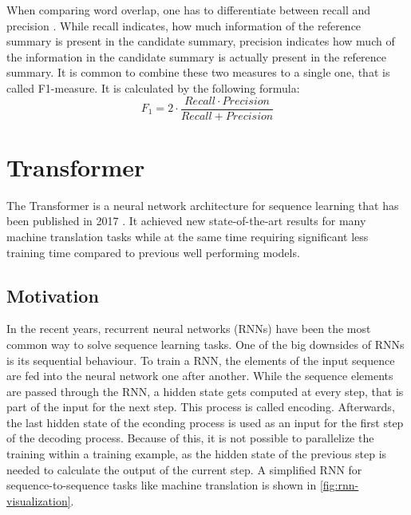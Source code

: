 When comparing word overlap, one has to differentiate between recall and precision \cite{Ting2010}.
While recall indicates, how much information of the reference summary is present in the candidate summary, precision indicates how much of the information in the candidate summary is actually present in the reference summary.
It is common to combine these two measures to a single one, that is called F1-measure.
It is calculated by the following formula:
\[
	F_1 = 2 \cdot \frac{Recall \cdot Precision}{Recall + Precision}
\]


\section{Transformer}\label{sec:transformer}

The Transformer is a neural network architecture for sequence learning that has been published in 2017 \cite{1706.03762}.
It achieved new state-of-the-art results for many machine translation tasks while at the same time requiring significant less training time compared to previous well performing models.

\subsection{Motivation}\label{ssec:transformer-motivation}

In the recent years, recurrent neural networks (RNNs) have been the most common way to solve sequence learning tasks.
One of the big downsides of RNNs is its sequential behaviour.
To train a RNN, the elements of the input sequence are fed into the neural network one after another.
While the sequence elements are passed through the RNN, a hidden state gets computed at every step, that is part of the input for the next step.
This process is called encoding.
Afterwards, the last hidden state of the econding process is used as an input for the first step of the decoding process.
Because of this, it is not possible to parallelize the training within a training example, as the hidden state of the previous step is needed to calculate the output of the current step. \cite[p.~2]{1706.03762}
A simplified RNN for sequence-to-sequence tasks like machine translation is shown in \cref{fig:rnn-visualization}.

